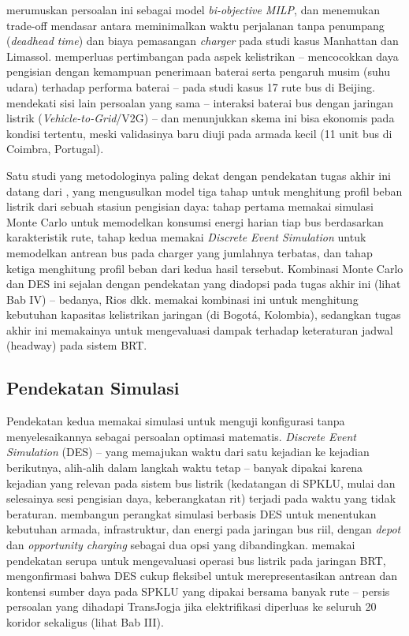 \textcite{rizopoulos2025} merumuskan persoalan
ini sebagai model \textit{bi-objective MILP}, dan menemukan trade-off
mendasar antara meminimalkan waktu perjalanan tanpa penumpang
(\textit{deadhead time}) dan biaya pemasangan \textit{charger} pada studi
kasus Manhattan dan Limassol. \textcite{liu2021}
memperluas pertimbangan pada aspek kelistrikan -- mencocokkan daya
pengisian dengan kemampuan penerimaan baterai serta pengaruh musim (suhu
udara) terhadap performa baterai -- pada studi kasus 17 rute bus di
Beijing. \textcite{manzolli2022} mendekati
sisi lain persoalan yang sama -- interaksi baterai bus dengan jaringan
listrik (\textit{Vehicle-to-Grid}/V2G) -- dan menunjukkan skema ini bisa
ekonomis pada kondisi tertentu, meski validasinya baru diuji pada armada
kecil (11 unit bus di Coimbra, Portugal).

Satu studi yang metodologinya paling dekat dengan pendekatan tugas akhir
ini datang dari \textcite{rios2014}, yang mengusulkan model tiga
tahap untuk menghitung profil beban listrik dari sebuah stasiun pengisian
daya: tahap pertama memakai simulasi Monte Carlo untuk memodelkan
konsumsi energi harian tiap bus berdasarkan karakteristik rute, tahap kedua
memakai \textit{Discrete Event Simulation} untuk memodelkan antrean bus
pada charger yang jumlahnya terbatas, dan tahap ketiga menghitung profil
beban dari kedua hasil tersebut. Kombinasi Monte Carlo dan DES ini sejalan
dengan pendekatan yang diadopsi pada tugas akhir ini (lihat Bab IV) --
bedanya, Rios dkk. memakai kombinasi ini untuk menghitung kebutuhan
kapasitas kelistrikan jaringan (di Bogotá, Kolombia), sedangkan tugas akhir
ini memakainya untuk mengevaluasi dampak terhadap keteraturan jadwal
(headway) pada sistem BRT.

\subsection{Pendekatan Simulasi}

Pendekatan kedua memakai simulasi untuk menguji konfigurasi tanpa
menyelesaikannya sebagai persoalan optimasi matematis. \textit{Discrete
	Event Simulation} (DES) -- yang memajukan waktu dari satu kejadian ke
kejadian berikutnya, alih-alih dalam langkah waktu tetap -- banyak dipakai
karena kejadian yang relevan pada sistem bus listrik (kedatangan di SPKLU,
mulai dan selesainya sesi pengisian daya, keberangkatan rit) terjadi pada
waktu yang tidak beraturan. \textcite{jefferiesgohlich2020}
membangun perangkat simulasi berbasis DES untuk menentukan kebutuhan
armada, infrastruktur, dan energi pada jaringan bus riil, dengan
\textit{depot} dan \textit{opportunity charging} sebagai dua opsi yang
dibandingkan. \textcite{sebastiani2016} memakai pendekatan
serupa untuk mengevaluasi operasi bus listrik pada jaringan BRT,
mengonfirmasi bahwa DES cukup fleksibel untuk merepresentasikan antrean dan
kontensi sumber daya pada SPKLU yang dipakai bersama banyak rute -- persis
persoalan yang dihadapi TransJogja jika elektrifikasi diperluas ke seluruh
20 koridor sekaligus (lihat Bab III).

